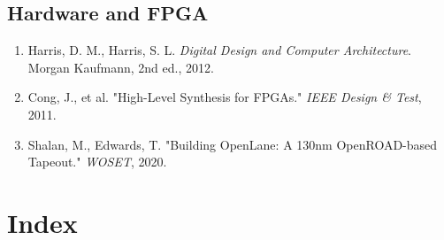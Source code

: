 \documentclass[11pt, a4paper, openany]{book}
\theoremstyle{definition}
\begin{document}
\section*{Hardware and FPGA}
\begin{enumerate}[resume]
    \item Harris, D. M., Harris, S. L. \textit{Digital Design and Computer Architecture}. Morgan Kaufmann, 2nd ed., 2012.
    \item Cong, J., et al. "High-Level Synthesis for FPGAs." \textit{IEEE Design \& Test}, 2011.
    \item Shalan, M., Edwards, T. "Building OpenLane: A 130nm OpenROAD-based Tapeout." \textit{WOSET}, 2020.
\end{enumerate}

\chapter*{Index}
\small
\end{document}
